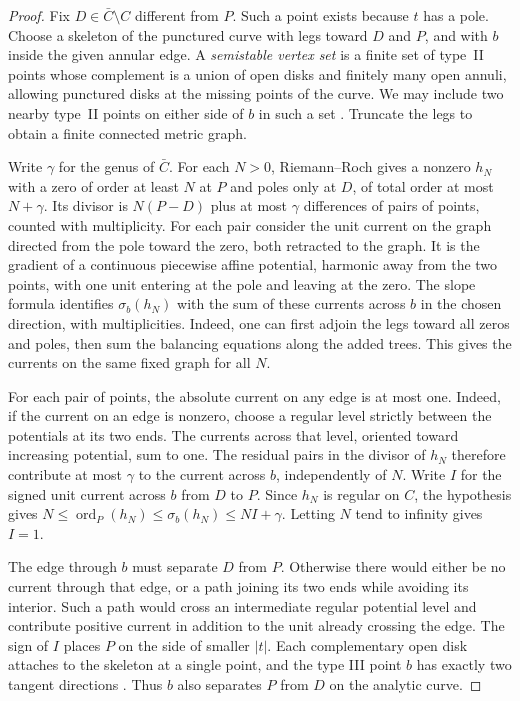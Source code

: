 \documentclass[11pt,reqno]{amsart}
\numberwithin{equation}{section}
\theoremstyle{definition}
\theoremstyle{remark}
\DeclareMathOperator{\ord}{ord}
\begin{document}
\begin{proof}
Fix \(D\in\bar C\setminus C\) different from \(P\). Such a point
exists because \(t\) has a pole. Choose a skeleton of the punctured
curve with legs toward \(D\) and \(P\), and with \(b\) inside the
given annular edge. A \emph{semistable vertex set} is a finite set of
type~II points whose complement is a union of open disks and finitely
many open annuli, allowing punctured disks at the missing points of the
curve. We may include two nearby type~II points on either
side of \(b\) in such a set
\cite[Proposition~3.13(3) and Corollary~5.10]{BPR}.
Truncate the legs to obtain a finite connected metric graph.

Write \(\gamma\) for the genus of \(\bar C\). For each \(N>0\),
Riemann--Roch gives a nonzero \(h_N\) with a zero of order at least
\(N\) at \(P\) and poles only at \(D\), of total order at most
\(N+\gamma\). Its divisor is \(N(P-D)\) plus at most \(\gamma\)
differences of pairs of points, counted with multiplicity. For each
pair consider the unit current on the graph directed from the pole
toward the zero, both retracted to the graph. It is the gradient
of a continuous piecewise affine potential, harmonic away from the
two points, with one unit entering at the pole and leaving at the
zero. The slope formula \cite[Theorem~5.15]{BPR} identifies
\(\sigma_b(h_N)\) with the sum of these currents across \(b\) in
the chosen direction, with multiplicities. Indeed, one can first
adjoin the legs toward all zeros and poles, then sum the balancing
equations along the added trees. This gives the currents on the
same fixed graph for all \(N\).

For each pair of points, the absolute current on any edge is at most
one. Indeed, if the current on an edge is nonzero, choose a regular
level strictly between the potentials at its two ends. The currents
across that level, oriented toward increasing potential, sum to one.
The residual pairs in the divisor of \(h_N\) therefore contribute at
most \(\gamma\) to the current across \(b\), independently of \(N\).
Write \(I\) for the signed unit current across \(b\) from \(D\) to \(P\).
Since \(h_N\) is regular on \(C\), the hypothesis gives
\(N\le\ord_P(h_N)\le\sigma_b(h_N)\le NI+\gamma\).
Letting \(N\) tend to infinity gives \(I=1\).

The edge through \(b\) must separate \(D\) from \(P\). Otherwise
there would either be no current through that edge, or a path joining
its two ends while avoiding its interior. Such a path would cross an
intermediate regular potential level and contribute positive current
in addition to the unit already crossing the edge. The sign of \(I\)
places \(P\) on the side of smaller \(|t|\). Each complementary open
disk attaches to the skeleton at a single point, and the type III
point \(b\) has exactly two tangent directions
\cite[Lemma~5.12(2)]{BPR}. Thus \(b\) also separates \(P\) from \(D\)
on the analytic curve.


\end{proof}
\end{document}

